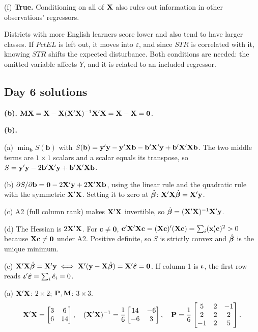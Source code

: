 \documentclass[11pt]{article}
\begin{document}
(f) \textbf{True.} Conditioning on all of $\mathbf{X}$ also rules out information in other observations' regressors.

 Districts with more English learners score lower and also tend to have larger classes. If $PctEL$ is left out, it moves into $\varepsilon$, and since $STR$ is correlated with it, knowing $STR$ shifts the expected disturbance. Both conditions are needed: the omitted variable affects $Y$, and it is related to an included regressor.

\subsection{Day 6 solutions}

 \textbf{(b).} $\mathbf{M}\mathbf{X}=\mathbf{X}-\mathbf{X}(\mathbf{X}'\mathbf{X})^{-1}\mathbf{X}'\mathbf{X}=\mathbf{X}-\mathbf{X}=\mathbf0$.

 \textbf{(b).}

(a) $\min_{\mathbf b}S(\mathbf b)$ with $S(\mathbf b)=\mathbf{y}'\mathbf{y}-\mathbf{y}'\mathbf{X}\mathbf b-\mathbf b'\mathbf{X}'\mathbf{y}+\mathbf b'\mathbf{X}'\mathbf{X}\mathbf b$. The two middle terms are $1\times1$ scalars and a scalar equals its transpose, so $S=\mathbf{y}'\mathbf{y}-2\mathbf b'\mathbf{X}'\mathbf{y}+\mathbf b'\mathbf{X}'\mathbf{X}\mathbf b$.

(b) $\partial S/\partial\mathbf b=\mathbf0-2\mathbf{X}'\mathbf{y}+2\mathbf{X}'\mathbf{X}\mathbf b$, using the linear rule and the quadratic rule with the symmetric $\mathbf{X}'\mathbf{X}$. Setting it to zero at $\hat{\bm{\beta}}$: $\mathbf{X}'\mathbf{X}\hat{\bm{\beta}}=\mathbf{X}'\mathbf{y}$.

(c) A2 (full column rank) makes $\mathbf{X}'\mathbf{X}$ invertible, so $\hat{\bm{\beta}}=(\mathbf{X}'\mathbf{X})^{-1}\mathbf{X}'\mathbf{y}$.

(d) The Hessian is $2\mathbf{X}'\mathbf{X}$. For $\mathbf c\ne\mathbf0$, $\mathbf c'\mathbf{X}'\mathbf{X}\mathbf c=(\mathbf{X}\mathbf c)'(\mathbf{X}\mathbf c)=\sum_i(\mathbf x_i'\mathbf c)^2>0$ because $\mathbf{X}\mathbf c\neq\mathbf0$ under A2. Positive definite, so $S$ is strictly convex and $\hat{\bm{\beta}}$ is the unique minimum.

(e) $\mathbf{X}'\mathbf{X}\hat{\bm{\beta}}=\mathbf{X}'\mathbf{y}\iff\mathbf{X}'(\mathbf{y}-\mathbf{X}\hat{\bm{\beta}})=\mathbf{X}'\hat{\bm{\varepsilon}}=\mathbf0$. If column 1 is $\bm{\iota}$, the first row reads $\bm{\iota}'\hat{\bm{\varepsilon}}=\sum_i\hat e_i=0$.

(a) $\mathbf{X}'\mathbf{X}$: $2\times2$; $\mathbf{P},\mathbf{M}$: $3\times3$.
\[ \mathbf{X}'\mathbf{X}=\begin{bmatrix}3&6\\6&14\end{bmatrix}, \quad (\mathbf{X}'\mathbf{X})^{-1}=\frac16\begin{bmatrix}14&-6\\-6&3\end{bmatrix}, \quad \mathbf{P}=\frac16\begin{bmatrix}5&2&-1\\2&2&2\\-1&2&5\end{bmatrix}. \]
\end{document}
